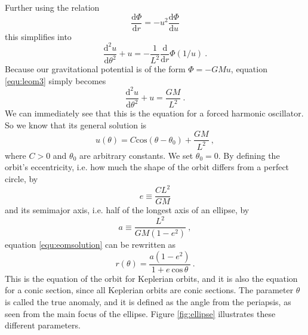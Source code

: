 \documentclass[english, oneside]{HYgradu}
\begin{document}
Further using the relation
\begin{equation}
\frac{\mathrm{d} \Phi}{\mathrm{d} r} = -u^2 \frac{\mathrm{d} \Phi}{\mathrm{d} u}
\end{equation}
this simplifies into
\begin{equation}
\frac{\mathrm{d}^2 u}{\mathrm{d} \theta^2} + u = -\frac{1}{L^2} \frac{\mathrm{d}}{\mathrm{d} r} \Phi (1/u) \label{equ:leom3} \ .
\end{equation}
Because our gravitational potential is of the form $\Phi = -GMu$, equation \eqref{equ:leom3} simply becomes
\begin{equation}
\frac{\mathrm{d}^2 u}{\mathrm{d} \theta^2} + u = \frac{GM}{L^2} \ .
\end{equation}
We can immediately see that this is the equation for a forced harmonic oscillator. So we know that its general solution is
\begin{equation}
u(\theta) = C \mathrm{cos}(\theta - \theta_0) + \frac{GM}{L^2} \label{equ:eomsolution} \ ,
\end{equation}
where $C > 0$ and $\theta_0$ are arbitrary constants. We set $\theta_0 = 0$. By defining the orbit's eccentricity, i.e. how much the shape of the orbit differs from a perfect circle, by 
\begin{equation}
e \equiv \frac{CL^2}{GM}
\end{equation}
and its semimajor axis, i.e. half of the longest axis of an ellipse, by
\begin{equation}
a \equiv \frac{L^2}{GM(1-e^2)} \ ,
\end{equation}
equation \eqref{equ:eomsolution} can be rewritten as 
\begin{equation}
r(\theta) = \frac{a (1-e^2)}{1 + e \ \mathrm{cos} \, \theta} \ .
\end{equation}
This is the equation of the orbit for Keplerian orbits, and it is also the equation for a conic section, since all Keplerian orbits are conic sections. The parameter $\theta$ is called the true anomaly, and it is defined as the angle from the periapsis, as seen from the main focus of the ellipse. Figure \ref{fig:ellipse} illustrates these different parameters.
\end{document}
